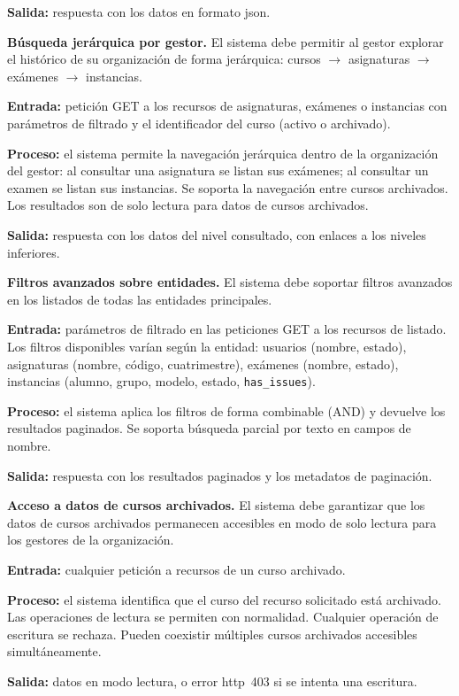 \begin{functional}
    \textbf{Salida:} respuesta con los datos en formato \acs{json}.

    \item \textbf{Búsqueda jerárquica por gestor.} \label{rf:export:hierarchical}
    El sistema debe permitir al gestor explorar el histórico de su organización de forma
    jerárquica: cursos $\rightarrow$ asignaturas $\rightarrow$ exámenes $\rightarrow$
    instancias.

    \textbf{Entrada:} petición GET a los recursos de asignaturas, exámenes o instancias con
    parámetros de filtrado y el identificador del curso (activo o archivado).

    \textbf{Proceso:} el sistema permite la navegación jerárquica dentro de la organización
    del gestor: al consultar una asignatura se listan sus exámenes; al consultar un examen
    se listan sus instancias. Se soporta la navegación entre cursos archivados. Los
    resultados son de solo lectura para datos de cursos archivados.

    \textbf{Salida:} respuesta con los datos del nivel consultado, con enlaces a los niveles
    inferiores.

    \item \textbf{Filtros avanzados sobre entidades.} \label{rf:export:filters}
    El sistema debe soportar filtros avanzados en los listados de todas las entidades
    principales.

    \textbf{Entrada:} parámetros de filtrado en las peticiones GET a los recursos de
    listado. Los filtros disponibles varían según la entidad: usuarios (nombre, estado),
    asignaturas (nombre, código, cuatrimestre), exámenes (nombre, estado), instancias
    (alumno, grupo, modelo, estado, \texttt{has\_issues}).

    \textbf{Proceso:} el sistema aplica los filtros de forma combinable (AND) y devuelve los
    resultados paginados. Se soporta búsqueda parcial por texto en campos de nombre.

    \textbf{Salida:} respuesta con los resultados paginados y los metadatos de paginación.

    \item \textbf{Acceso a datos de cursos archivados.} \label{rf:export:archived}
    El sistema debe garantizar que los datos de cursos archivados permanecen accesibles en
    modo de solo lectura para los gestores de la organización.

    \textbf{Entrada:} cualquier petición a recursos de un curso archivado.

    \textbf{Proceso:} el sistema identifica que el curso del recurso solicitado está
    archivado. Las operaciones de lectura se permiten con normalidad. Cualquier operación de
    escritura se rechaza. Pueden coexistir múltiples cursos archivados accesibles
    simultáneamente.

    \textbf{Salida:} datos en modo lectura, o error \acs{http}~403 si se intenta una
    escritura.

\end{functional}
